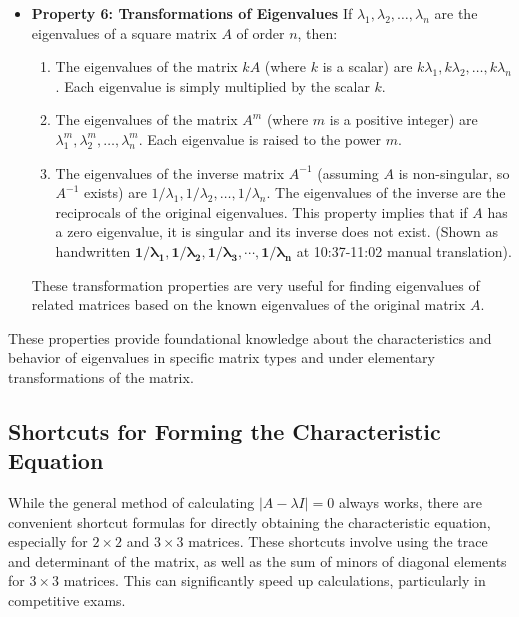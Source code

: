 \documentclass{article}
\begin{document}
\begin{itemize}
    \item \textbf{Property 6: Transformations of Eigenvalues}
    If $\lambda_1, \lambda_2, \dots, \lambda_n$ are the eigenvalues of a square matrix $A$ of order $n$, then:
    \begin{enumerate}
        \item The eigenvalues of the matrix $kA$ (where $k$ is a scalar) are $k\lambda_1, k\lambda_2, \dots, k\lambda_n$. Each eigenvalue is simply multiplied by the scalar $k$.
        \item The eigenvalues of the matrix $A^m$ (where $m$ is a positive integer) are $\lambda_1^m, \lambda_2^m, \dots, \lambda_n^m$. Each eigenvalue is raised to the power $m$.
        \item The eigenvalues of the inverse matrix $A^{-1}$ (assuming $A$ is non-singular, so $A^{-1}$ exists) are $1/\lambda_1, 1/\lambda_2, \dots, 1/\lambda_n$. The eigenvalues of the inverse are the reciprocals of the original eigenvalues. This property implies that if $A$ has a zero eigenvalue, it is singular and its inverse does not exist. (Shown as handwritten $\mathbf{1/ \lambda _ { 1 } , 1/ \lambda _ { 2 } , 1/ \lambda _ { 3 } , \cdots , 1/ \lambda _ { n }}$ at 10:37-11:02 manual translation).
    \end{enumerate}
   These transformation properties are very useful for finding eigenvalues of related matrices based on the known eigenvalues of the original matrix $A$.

\end{itemize}

These properties provide foundational knowledge about the characteristics and behavior of eigenvalues in specific matrix types and under elementary transformations of the matrix.


\subsection{Shortcuts for Forming the Characteristic Equation} %

While the general method of calculating $|A - \lambda I| = 0$ always works, there are convenient shortcut formulas for directly obtaining the characteristic equation, especially for $2 \times 2$ and $3 \times 3$ matrices. These shortcuts involve using the trace and determinant of the matrix, as well as the sum of minors of diagonal elements for $3 \times 3$ matrices. This can significantly speed up calculations, particularly in competitive exams.
\end{document}
